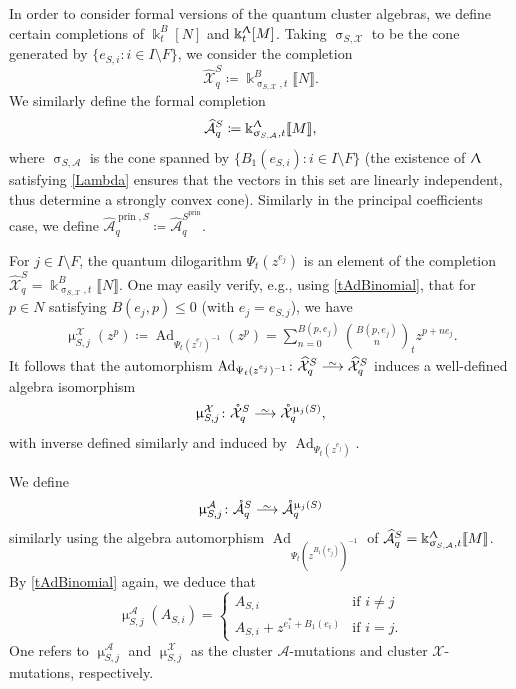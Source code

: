 \documentclass{amsart}
\DeclareMathOperator{\prin}{prin}
\DeclareMathOperator{\Ad}{Ad}
\let\llb=\llbracket
\let\rrb=\rrbracket
\let\s=\mathcal
\let\wh=\widehat
\let\mr=\mathring
\def\risom{\buildrel\sim\over{\smashedlongrightarrow}}
\def\smashedlongrightarrow{\setbox0=\hbox{$\longrightarrow$}\ht0=1.25pt\box0}
\newcommand {\kk} {\Bbbk}
\renewcommand{\sigma}{\upsigma}
\renewcommand{\Lambda}{\Uplambda}
\renewcommand{\mu}{\upmu}
\theoremstyle{plain}%
\theoremstyle{definition}
\theoremstyle{remark}
\begin{document}
In order to consider formal versions of the quantum cluster algebras, we define certain completions of $\kk_t^B[N]$ and $\kk_t^{\Lambda}[M]$.  Taking $\sigma_{S,\s{X}}$ to be the cone generated by $\{e_{S,i}\colon i\in I\setminus F\}$, we consider the completion $$\wh{\s{X}}_q^{S}\coloneqq \kk_{\sigma_{S,\s{X}},t}^B\llb N\rrb.$$  
We similarly define the formal completion $$\wh{\s{A}}_q^S\coloneqq \kk_{\sigma_{S,\s{A}},t}^{\Lambda}\llb M\rrb,$$ where $\sigma_{S,\s{A}}$ is the cone spanned by $\{B_1(e_{S,i})\colon i\in I\setminus F\}$ (the existence of $\Lambda$ satisfying \eqref{Lambda} ensures that the vectors in this set are linearly independent, thus determine a strongly convex cone).  Similarly in the principal coefficients case, we define $\wh{\s{A}}_q^{\prin,S}\coloneqq \wh{\s{A}}_q^{S^{\prin}}$. 




For $j\in I\setminus F$, the quantum dilogarithm $\Psi_t(z^{e_j})$ is an element of the completion $\wh{\s{X}}^S_q=\kk^B_{\sigma_{S,\s{X}},t}\llb N\rrb$.  One may easily verify, e.g., using \eqref{tAdBinomial}, that for $p\in N$ satisfying $B(e_j,p)\leq 0$ (with $e_j=e_{S,j}$), we have
\begin{align}\label{Xmut}
\mu_{S,j}^{\s{X}}(z^p)\coloneqq \Ad_{\Psi_t(z^{e_{j}})^{-1}}(z^{p})=\sum_{n=0}^{B(p,e_{j})}\binom{B(p,e_{j})}{n}_tz^{p+ne_{j}}.
\end{align}
It follows that the automorphism $\Ad_{\Psi_t(z^{e_j})^{-1}}\colon  \wh{\s{X}}^S_q\risom \wh{\s{X}}^S_q$ induces a well-defined algebra isomorphism 
\[
\mu_{S,j}^{\s{X}}\colon \mr{\s{X}}_q^S  \risom \mr{\s{X}}^{\mu_j(S)}_q,
\]
with inverse defined similarly and induced by  $\Ad_{\Psi_t(z^{e_j})}$. 

We define 
\[
\mu_{S,j}^{\s{A}}\colon\mr{\s{A}}_q^S \risom \mr{\s{A}}^{\mu_j(S)}_q
\]
similarly using the algebra automorphism $\Ad_{\Psi_t(z^{B_1(e_j)})^{-1}}$ of $\wh{\s{A}}_q^S=\kk_{\sigma_{S,\s{A}},t}^{\Lambda}\llb M\rrb$.  
By \eqref{tAdBinomial} again, we deduce that
\begin{equation}\label{clust_transf}
\mu_{S,j}^{\s{A}}(A_{S,i})=\begin{cases}A_{S,i}& \textrm{if }i\neq j\\
A_{S,i}+z^{e_i^*+B_1(e_i)}&\textrm{if }i=j.\end{cases}
\end{equation}
One refers to $\mu_{S,j}^{\s{A}}$ and $\mu_{S,j}^{\s{X}}$ as the cluster $\s{A}$-mutations and cluster $\s{X}$-mutations, respectively.
\end{document}
